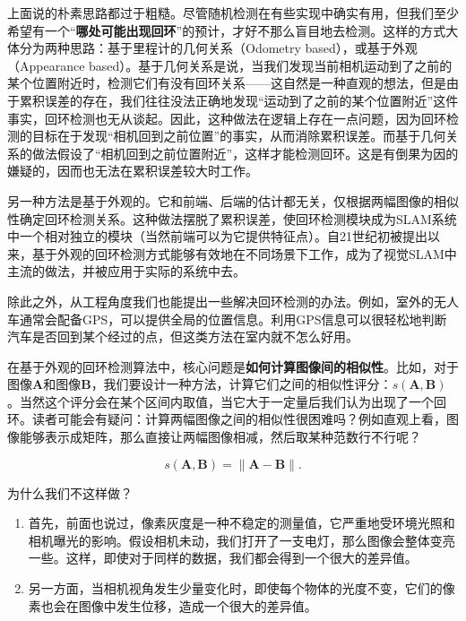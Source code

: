 上面说的朴素思路都过于粗糙。尽管随机检测在有些实现中确实有用\textsuperscript{\cite{Endres2014}}，但我们至少希望有一个“\textbf{哪处可能出现回环}”的预计，才好不那么盲目地去检测。这样的方式大体分为两种思路：基于里程计的几何关系（Odometry based），或基于外观（Appearance based）。基于几何关系是说，当我们发现当前相机运动到了之前的某个位置附近时，检测它们有没有回环关系\textsuperscript{\cite{Hahnel2003}}——这自然是一种直观的想法，但是由于累积误差的存在，我们往往没法正确地发现“运动到了之前的某个位置附近”这件事实，回环检测也无从谈起。因此，这种做法在逻辑上存在一点问题，因为回环检测的目标在于发现“相机回到之前位置”的事实，从而消除累积误差。而基于几何关系的做法假设了“相机回到之前位置附近”，这样才能检测回环。这是有倒果为因的嫌疑的，因而也无法在累积误差较大时工作\textsuperscript{\cite{Beeson2010}}。

另一种方法是基于外观的。它和前端、后端的估计都无关，仅根据两幅图像的相似性确定回环检测关系。这种做法摆脱了累积误差，使回环检测模块成为SLAM系统中一个相对独立的模块（当然前端可以为它提供特征点）。自21世纪初被提出以来，基于外观的回环检测方式能够有效地在不同场景下工作，成为了视觉SLAM中主流的做法，并被应用于实际的系统中去\textsuperscript{\cite{Ulrich2000, Latif2013, Mur-Artal2015}}。

除此之外，从工程角度我们也能提出一些解决回环检测的办法。例如，室外的无人车通常会配备GPS，可以提供全局的位置信息。利用GPS信息可以很轻松地判断汽车是否回到某个经过的点，但这类方法在室内就不怎么好用。

在基于外观的回环检测算法中，核心问题是\textbf{如何计算图像间的相似性}。比如，对于图像$\bm{A}$和图像$\bm{B}$，我们要设计一种方法，计算它们之间的相似性评分：$s(\bm{A}, \bm{B})$。当然这个评分会在某个区间内取值，当它大于一定量后我们认为出现了一个回环。读者可能会有疑问：计算两幅图像之间的相似性很困难吗？例如直观上看，图像能够表示成矩阵，那么直接让两幅图像相减，然后取某种范数行不行呢？

\begin{equation}
s(\bm{A}, \bm{B}) = \| \bm{A}-\bm{B} \|.
\end{equation}

为什么我们不这样做？

\begin{enumerate}
	\item 首先，前面也说过，像素灰度是一种不稳定的测量值，它严重地受环境光照和相机曝光的影响。假设相机未动，我们打开了一支电灯，那么图像会整体变亮一些。这样，即使对于同样的数据，我们都会得到一个很大的差异值。
	\item 另一方面，当相机视角发生少量变化时，即使每个物体的光度不变，它们的像素也会在图像中发生位移，造成一个很大的差异值。
\end{enumerate}

